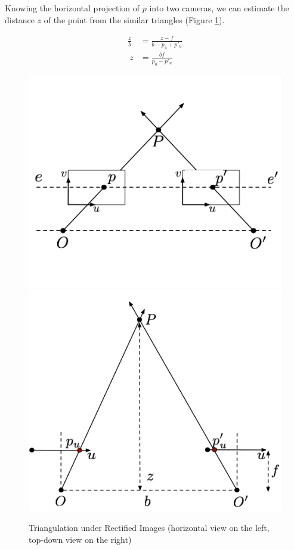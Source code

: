 \documentclass[twoside]{article}
\begin{document}
Knowing the horizontal projection of $p$ into two cameras, we can estimate the distance $z$ of the point from the similar triangles (Figure \ref{recttri}).

\begin{align}
  \frac{z}{b} &= \frac{z-f}{b-p_u+p'_u} \\
  \ z &= \frac{bf}{p_u-p'_u}
\end{align}

\begin{figure}[h!]
  \begin{center}
	\includegraphics[scale=0.45]{rectified_triangulation_1_.PNG}
	\includegraphics[scale=0.4]{rectified_triangulation_2_.PNG}  \end{center}
  \caption{Triangulation under Rectified Images (horizontal view on the left, top-down view on the right)}
  \label{recttri}
\end{figure}
\end{document}
